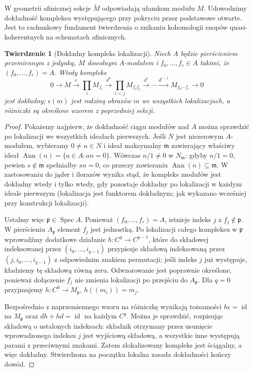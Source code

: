 \documentclass[11pt,a4paper,openany]{report}
\numberwithin{equation}{section}
\theoremstyle{plain}
\newtheorem{twierdzenie}{Twierdzenie}[section]
\theoremstyle{definition}
\theoremstyle{remark}
\newcommand{\Spec}{\operatorname{Spec}}
\begin{document}
W geometrii afinicznej sekcje $\widetilde M$ odpowiadają
ułamkom modułu $M$. Udowodnimy dokładność kompleksu
występującego przy pokryciu przez podstawowe otwarte.
Jest to rachunkowy fundament twierdzenia o znikaniu
kohomologii snopów quasi-koherentnych na schematach afinicznych.

\begin{twierdzenie}[Dokładny kompleks lokalizacji]
\label{tw:affine-cech-exact}
Niech $A$ będzie pierścieniem przemiennym z jedynką,
$M$ dowolnym $A$-modułem i $f_0,\ldots,f_r\in A$
takimi, że $(f_0,\ldots,f_r)=A$. Wtedy kompleks
\[
0\longrightarrow M\xrightarrow{\epsilon}
\prod_iM_{f_i}\xrightarrow{d^0}
\prod_{i<j}M_{f_if_j}\xrightarrow{d^1}\cdots
\xrightarrow{d^{r-1}}M_{f_0\cdots f_r}\longrightarrow0
\]
jest dokładny; $\epsilon(m)$ jest rodziną obrazów
$m$ we wszystkich lokalizacjach, a różniczki są
określone wzorem z poprzedniej sekcji.
\end{twierdzenie}
\begin{proof}
Pokażemy najpierw, że dokładność ciągu modułów nad
$A$ można sprawdzić po lokalizacji we wszystkich
ideałach pierwszych. Jeśli $N$ jest niezerowym
$A$-modułem, wybieramy $0\ne n\in N$ i ideał
maksymalny $\mathfrak m$ zawierający właściwy ideał
$\operatorname{Ann}(n)=\{a\in A:an=0\}$.
Wówczas $n/1\ne0$ w $N_{\mathfrak m}$:
gdyby $n/1=0$, pewien $s\notin\mathfrak m$
spełniałby $sn=0$, co przeczy zawieraniu
$\operatorname{Ann}(n)\subseteq\mathfrak m$.
W zastosowaniu do jąder i ilorazów wynika stąd,
że kompleks modułów jest dokładny wtedy i tylko wtedy,
gdy pozostaje dokładny po lokalizacji w każdym
ideale pierwszym (lokalizacja jest funktorem dokładnym;
jak wykazano wcześniej przy konstrukcji lokalizacji).

Ustalmy więc $\mathfrak p\in\Spec A$. Ponieważ
$(f_0,\ldots,f_r)=A$, istnieje indeks $j$ z
$f_j\notin\mathfrak p$. W pierścieniu $A_{\mathfrak p}$
element $f_j$ jest jednostką. Po lokalizacji całego
kompleksu w $\mathfrak p$ wprowadźmy dodatkowe działanie
$h:C^q\to C^{q-1}$, które do składowej indeksowanej
przez $(i_0,\ldots,i_{q-1})$ przypisuje składową
indeksowaną przez $(j,i_0,\ldots,i_{q-1})$ z odpowiednim
znakiem permutacji; jeśli indeks $j$ już występuje,
kładziemy tę składową równą zeru. Odwzorowanie jest
poprawnie określone, ponieważ dołączenie $f_j$
nie zmienia lokalizacji po przejściu do $A_{\mathfrak p}$.
Dla $q=0$ przyjmujemy $h:C^0\to M_{\mathfrak p}$,
$h((m_i))=m_j$.

Bezpośrednio z naprzemiennego wzoru na różniczkę
wynikają tożsamości
$h\epsilon=\operatorname{id}$ na $M_{\mathfrak p}$
oraz $dh+hd=\operatorname{id}$ na każdym $C^q$.
Można je sprawdzić, rozpisując składową o ustalonych
indeksach: składnik otrzymany przez usunięcie
wprowadzonego indeksu $j$ jest wyjściową składową,
a wszystkie inne występują parami z przeciwnymi znakami.
Zatem zlokalizowany kompleks jest ściągalny, a więc
dokładny. Stwierdzona na początku lokalna zasada
dokładności kończy dowód.
\end{proof}
\end{document}
